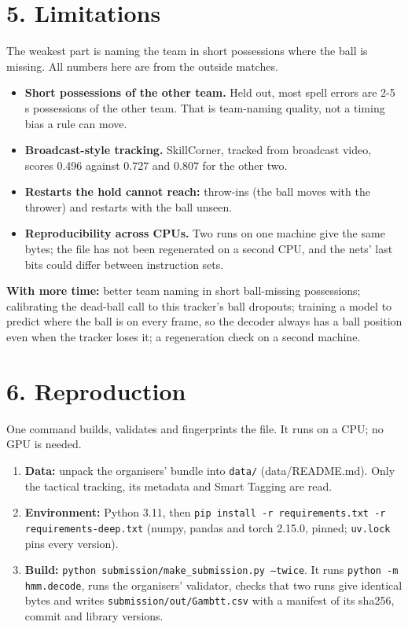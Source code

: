 \documentclass[11pt,a4paper]{article}
\newcommand{\code}[1]{\texttt{#1}}
\begin{document}
\section{5. Limitations}

The weakest part is naming the team in short possessions where the ball is missing. All numbers here are from the outside matches.
\begin{itemize}
  \item \textbf{Short possessions of the other team.} Held out, most spell errors are 2-5 s possessions of the other team. That is team-naming quality, not a timing bias a rule can move.
  \item \textbf{Broadcast-style tracking.} SkillCorner, tracked from broadcast video, scores 0.496 against 0.727 and 0.807 for the other two.
  \item \textbf{Restarts the hold cannot reach:} throw-ins (the ball moves with the thrower) and restarts with the ball unseen.
  \item \textbf{Reproducibility across CPUs.} Two runs on one machine give the same bytes; the file has not been regenerated on a second CPU, and the nets' last bits could differ between instruction sets.
\end{itemize}

\textbf{With more time:} better team naming in short ball-missing possessions; calibrating the dead-ball call to this tracker's ball dropouts; training a model to predict where the ball is on every frame, so the decoder always has a ball position even when the tracker loses it; a regeneration check on a second machine.

\section{6. Reproduction}

One command builds, validates and fingerprints the file. It runs on a CPU; no GPU is needed.
\begin{enumerate}
  \item \textbf{Data:} unpack the organisers' bundle into \code{data/} (data/README.md). Only the tactical tracking, its metadata and Smart Tagging are read.
  \item \textbf{Environment:} Python 3.11, then \code{pip install -r requirements.txt -r requirements-deep.txt} (numpy, pandas and torch 2.15.0, pinned; \code{uv.lock} pins every version).
  \item \textbf{Build:} \code{python submission/make\_submission.py --twice}. It runs \code{python -m hmm.decode}, runs the organisers' validator, checks that two runs give identical bytes and writes \code{submission/out/Gambtt.csv} with a manifest of its sha256, commit and library versions.
\end{enumerate}
\end{document}
